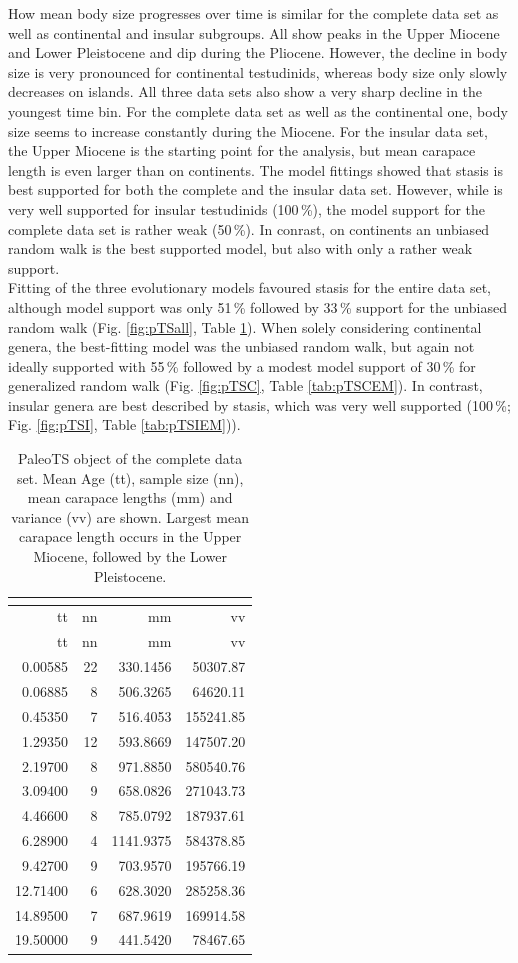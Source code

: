 How mean body size progresses over time is similar for the complete data set as well as continental and insular subgroups. All show peaks in the Upper Miocene and Lower Pleistocene and dip during the Pliocene. However, the decline in body size is very pronounced for continental testudinids, whereas body size only slowly decreases on islands. All three data sets also show a very sharp decline in the youngest time bin.
For the complete data set as well as the continental one, body size seems to increase constantly during the Miocene. For the insular data set, the Upper Miocene is the starting point for the analysis, but mean carapace length is even larger than on continents.
The model fittings showed that stasis is best supported for both the complete and the insular data set. However, while is very well supported for insular testudinids (100\,\%), the model support for the complete data set is rather weak (50\,\%). In conrast, on continents an unbiased random walk is the best supported model, but also with only a rather weak support.\\

Fitting of the three evolutionary models favoured stasis for the entire data set, although model support was only 51\,\% followed by 33\,\% support for the unbiased random walk (Fig. \ref{fig:pTSall}, Table \ref{tab:pTSall}). When solely considering continental genera, the best-fitting model was the unbiased random walk, but again not ideally supported with 55\,\% followed by a modest model support of 30\,\% for generalized random walk (Fig. \ref{fig:pTSC}, Table \ref{tab:pTSCEM}). In contrast, insular genera are best described by stasis, which was very well supported (100\,\%; Fig. \ref{fig:pTSI}, Table \ref{tab:pTSIEM})). 

\begin{longtable}[]{@{}rrrr@{}}
	\caption[PaleoTS object of complete dataset]{PaleoTS object of the complete data set. Mean Age (tt), sample size (nn), mean carapace lengths (mm) and variance (vv) are shown. Largest mean carapace length occurs in the Upper Miocene, followed by the Lower Pleistocene.}
	\label{tab:pTSall}\tabularnewline
	\toprule
	tt & nn & mm & vv\tabularnewline
	\midrule
	\endfirsthead
	\toprule
	tt & nn & mm & vv\tabularnewline
	\midrule
	\endhead
	0.00585 & 22 & 330.1456 & 50307.87\tabularnewline
	0.06885 & 8 & 506.3265 & 64620.11\tabularnewline
	0.45350 & 7 & 516.4053 & 155241.85\tabularnewline
	1.29350 & 12 & 593.8669 & 147507.20\tabularnewline
	2.19700 & 8 & 971.8850 & 580540.76\tabularnewline
	3.09400 & 9 & 658.0826 & 271043.73\tabularnewline
	4.46600 & 8 & 785.0792 & 187937.61\tabularnewline
	6.28900 & 4 & 1141.9375 & 584378.85\tabularnewline
	9.42700 & 9 & 703.9570 & 195766.19\tabularnewline
	12.71400 & 6 & 628.3020 & 285258.36\tabularnewline
	14.89500 & 7 & 687.9619 & 169914.58\tabularnewline
	19.50000 & 9 & 441.5420 & 78467.65\tabularnewline
	\bottomrule
\end{longtable}


